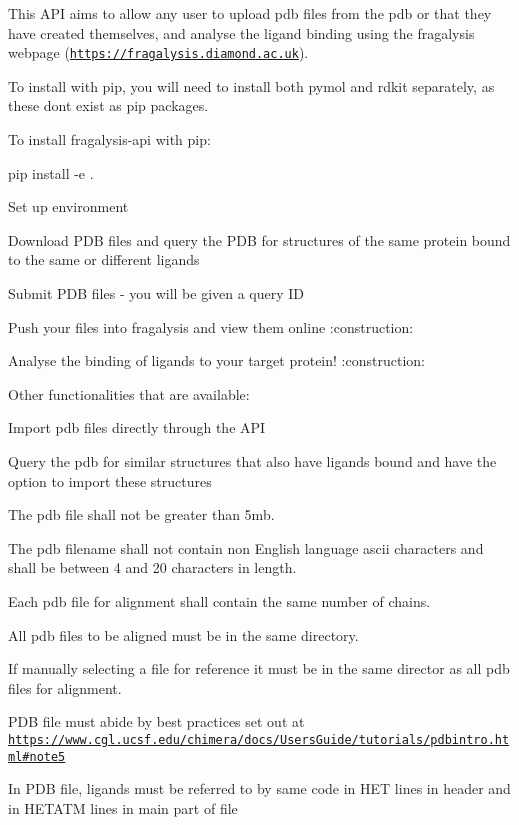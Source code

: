 This A\+PI aims to allow any user to upload pdb files from the pdb or that they have created themselves, and analyse the ligand binding using the fragalysis webpage (\href{https://fragalysis.diamond.ac.uk}{\tt https\+://fragalysis.\+diamond.\+ac.\+uk}).

To install with pip, you will need to install both pymol and rdkit separately, as these don\textquotesingle{}t exist as pip packages.

To install fragalysis-\/api with pip\+:


\begin{DoxyCode}
pip install -e .
\end{DoxyCode}



\begin{DoxyEnumerate}
\item Set up environment
\item Download P\+DB files and query the P\+DB for structures of the same protein bound to the same or different ligands
\item Submit P\+DB files -\/ you will be given a query ID
\item Push your files into fragalysis and view them online \+:construction\+:
\item Analyse the binding of ligands to your target protein! \+:construction\+:
\end{DoxyEnumerate}

Other functionalities that are available\+:
\begin{DoxyItemize}
\item Import pdb files directly through the A\+PI
\item Query the pdb for similar structures that also have ligands bound and have the option to import these structures
\end{DoxyItemize}


\begin{DoxyItemize}
\item The pdb file shall not be greater than 5mb.
\item The pdb filename shall not contain non English language ascii characters and shall be between 4 and 20 characters in length.
\item Each pdb file for alignment shall contain the same number of chains.
\item All pdb files to be aligned must be in the same directory.
\item If manually selecting a file for reference it must be in the same director as all pdb files for alignment.
\item P\+DB file must abide by best practices set out at \href{https://www.cgl.ucsf.edu/chimera/docs/UsersGuide/tutorials/pdbintro.html#note5}{\tt https\+://www.\+cgl.\+ucsf.\+edu/chimera/docs/\+Users\+Guide/tutorials/pdbintro.\+html\#note5}
\item In P\+DB file, ligands must be referred to by same code in \textquotesingle{}H\+ET\textquotesingle{} lines in header and in \textquotesingle{}H\+E\+T\+A\+TM\textquotesingle{} lines in main part of file
\end{DoxyItemize}

